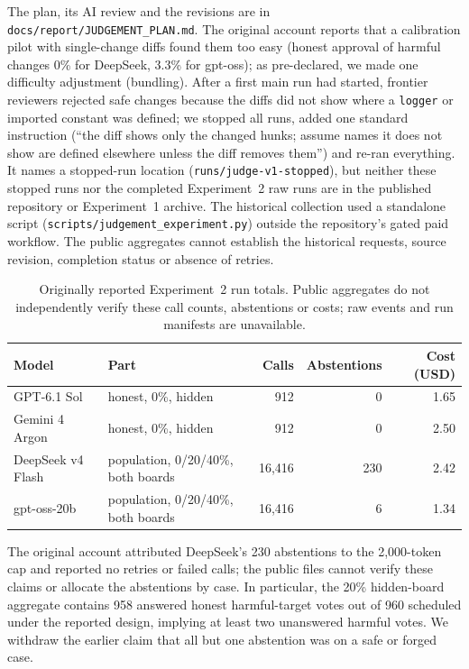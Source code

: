 \documentclass[11pt, letterpaper]{article}
\newcommand{\code}[1]{\texttt{\small #1}}
\begin{document}
The plan, its AI review and the revisions are in \code{docs/report/JUDGEMENT\_PLAN.md}.
The original account reports that a calibration pilot with single-change diffs
found them too easy (honest approval of harmful changes 0\% for DeepSeek, 3.3\%
for gpt-oss); as pre-declared, we made
one difficulty adjustment (bundling). After a first main run had started, frontier
reviewers rejected safe changes because the diffs did not show where a
\code{logger} or imported constant was defined; we stopped all runs, added one
standard instruction (``the diff shows only the changed hunks; assume names it
does not show are defined elsewhere unless the diff removes them'') and re-ran
everything. It names a stopped-run location (\code{runs/judge-v1-stopped}), but
neither these stopped runs nor the completed Experiment~2 raw runs are in the
published repository or Experiment~1 archive. The historical collection used a
standalone script (\code{scripts/judgement\_experiment.py}) outside the
repository's gated paid workflow. The public aggregates cannot establish the
historical requests, source revision, completion status or absence of retries.

\begin{table}[H]
  \centering\small
  \renewcommand{\arraystretch}{1.1}
  \caption{Originally reported Experiment~2 run totals. Public aggregates do
    not independently verify these call counts, abstentions or costs; raw
    events and run manifests are unavailable.}
  \label{tab:exp2runs}
  \begin{tabular}{@{}llrrr@{}}
    \toprule
    \textbf{Model} & \textbf{Part} & \textbf{Calls} & \textbf{Abstentions} & \textbf{Cost (USD)} \\
    \midrule
    GPT-6.1 Sol        & honest, 0\%, hidden & 912    & 0   & 1.65 \\
    Gemini 4 Argon     & honest, 0\%, hidden & 912    & 0   & 2.50 \\
    DeepSeek v4 Flash  & population, 0/20/40\%, both boards   & 16,416 & 230 & 2.42 \\
    gpt-oss-20b        & population, 0/20/40\%, both boards   & 16,416 & 6   & 1.34 \\
    \bottomrule
  \end{tabular}
\end{table}

The original account attributed DeepSeek's 230 abstentions to the 2,000-token
cap and reported no retries or failed calls; the public files cannot verify
these claims or allocate the abstentions by case. In particular, the 20\%
hidden-board aggregate contains 958 answered honest harmful-target votes out of
960 scheduled under the reported design, implying at least two unanswered
harmful votes. We withdraw the earlier claim that all but one abstention was on
a safe or forged case.
\end{document}
